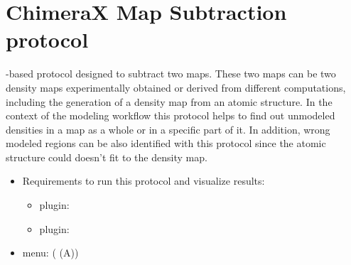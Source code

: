 \section{ChimeraX Map Subtraction protocol}
\label{app:chimeraMapSubtraction}%

\chimera-based protocol designed to subtract two maps. These two maps can be two density maps experimentally obtained or derived from different computations, including the generation of a density map from an atomic structure. In the context of the \scipion modeling workflow this protocol helps to find out unmodeled densities in a map as a whole or in a specific part of it. In addition, wrong modeled regions can be also identified with this protocol since the atomic structure could doesn't fit to the density map.  
   
 \begin{itemize}
  \item Requirements to run this protocol and visualize results:
            \begin{itemize}
                \item \scipion plugin: 
                \item \scipion plugin: 
            \end{itemize}
  \item \scipion menu:
         ( (A))
  

\end{itemize}
